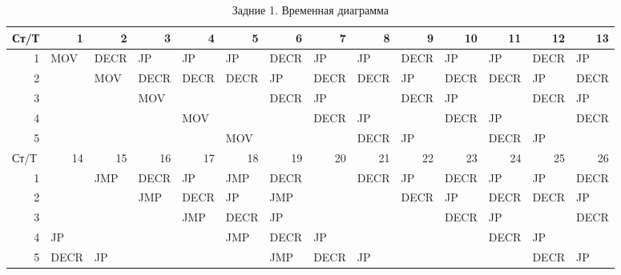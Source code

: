 \documentclass[a4paper,14pt]{extarticle}
\begin{document}
\begin{landscape}

\begin{table}[htbp]
	\centering
	\small
	\begin{tabular}{|r|l|l||l|l|l|l|l|l|l|l|l|l|l|}
		\hline
		\multicolumn{1}{|l|}{Ст/Т} & \multicolumn{1}{r|}{1} & \multicolumn{1}{r|}{2} & \multicolumn{1}{r|}{3} & \multicolumn{1}{r|}{4} & \multicolumn{1}{r|}{5} & \multicolumn{1}{r|}{6} & \multicolumn{1}{r|}{7} & \multicolumn{1}{r|}{8} & \multicolumn{1}{r|}{9} & \multicolumn{1}{r|}{10} & \multicolumn{1}{r|}{11} & \multicolumn{1}{r|}{12} & \multicolumn{1}{r|}{13} \\ \hline
		1 & MOV & DECR & JP & JP & JP & DECR & JP & JP & DECR & JP & JP & DECR & JP \\ \hline
		2 &  & MOV & DECR & DECR & DECR & JP & DECR & DECR & JP & DECR & DECR & JP & DECR \\ \hline
		3 &  &  & MOV &  &  & DECR & JP &  & DECR & JP &  & DECR & JP \\ \hline
		4 &  &  &  & MOV &  &  & DECR & JP &  & DECR & JP &  & DECR \\ \hline
		5 &  &  &  &  & MOV &  &  & DECR & JP &  & DECR & JP &  \\ \hline\hline
		\multicolumn{1}{|l|}{Ст/Т} & \multicolumn{1}{r|}{14} & \multicolumn{1}{r||}{15} & \multicolumn{1}{r|}{16} & \multicolumn{1}{r|}{17} & \multicolumn{1}{r|}{18} & \multicolumn{1}{r|}{19} & \multicolumn{1}{r|}{20} & \multicolumn{1}{r|}{21} & \multicolumn{1}{r|}{22} & \multicolumn{1}{r|}{23} & \multicolumn{1}{r|}{24} & \multicolumn{1}{r|}{25} & \multicolumn{1}{r|}{26} \\ \hline
		1 &  & JMP & DECR & JP & JMP & DECR &  & DECR & JP & DECR & JP & JP & DECR \\ \hline
		2 &  &  & JMP & DECR & JP & JMP &  &  & DECR & JP & DECR & DECR & JP \\ \hline
		3 &  &  &  & JMP & DECR & JP &  &  &  & DECR & JP &  & DECR \\ \hline
		4 & JP &  &  &  & JMP & DECR & JP &  &  &  & DECR & JP &  \\ \hline
		5 & DECR & JP &  &  &  & JMP & DECR & JP &  &  &  & DECR & JP \\ \hline
	\end{tabular}
	\caption{Задние 1. Временная диаграмма}
	\label{tab:time-1}
\end{table}
\newpage


\end{landscape}
\end{document}

